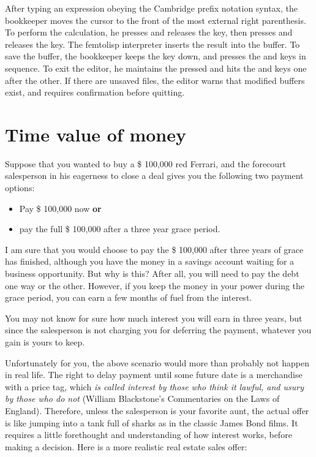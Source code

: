 \documentclass[a4paper,12pt]{book}
\begin{document}
After typing an expression obeying the
Cambridge prefix notation syntax,
the bookkeeper moves the cursor to the front
of the most external right parenthesis.
To perform the calculation,
he presses and releases the
 key, then presses and releases
the \keys{~]~} key. The femtolisp
interpreter inserts the result
into the buffer.
To save the buffer, the bookkeeper
keeps the  key down,
and presses the  and
 keys in sequence.
To exit the
editor, he maintains the 
pressed and hits the 
and  keys one after the other.
If there are
unsaved files, the editor warns
that modified buffers exist,
and requires confirmation before
quitting.

\section{Time value of money}
Suppose that you wanted to buy a \$ 100,000 red Ferrari,
and the forecourt salesperson in his eagerness to
close a deal gives you the following two payment options:  
\begin{itemize}
\item Pay \$ 100,000 now {\bf or}
\item pay the full \$ 100,000 after a three year grace period.
\end{itemize}

I am sure that you would choose to pay the \$ 100,000 after
three years of grace has finished, although you have the
money in a savings account waiting for a business
opportunity. But why is this? After all, you will need
to pay the debt one way or the other. However, if you
keep the money in your power during the grace period,
you can earn a few months of fuel from the interest.

You may not know for sure how much interest you
will earn in three years, but since the salesperson
is not charging you for deferring the payment,
whatever you gain is yours to keep.

Unfortunately for you, the above scenario would
more than probably not happen in real life.
The right to delay payment until some future
date is a merchandise with a price tag,
which {\em is called interest by those who
think it lawful, and usury by those who
do not} (William Blackstone's Commentaries
on the Laws of England). Therefore, unless
the salesperson is your favorite aunt,
the actual offer is like jumping into a tank
full of sharks as in the classic James Bond films.
It requires a little forethought and understanding
of how interest works, before making a decision.
Here is a more realistic real estate sales offer:
\end{document}
